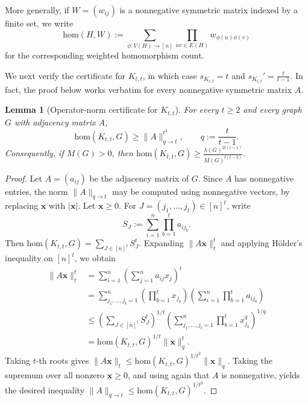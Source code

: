 \documentclass[11pt]{article}
\newtheorem{lemma}[theorem]{Lemma}
\theoremstyle{definition}
\theoremstyle{plain}
\newcommand{\homc}{\mathrm{hom}}
\begin{document}
More generally, if \(W=(w_{ij})\) is a nonnegative symmetric matrix indexed by a finite set, we write
\[
        \homc(H,W)
        :=
        \sum_{\phi:V(H)\to [n]}
        \prod_{uv\in E(H)} w_{\phi(u)\phi(v)}
\]
for the corresponding weighted homomorphism count.

We next verify the certificate for \(K_{t,t}\), in which case 
        $s_{K_{t,t}}=t$ and $
        s_{K_{t,t}}'=\frac{t}{t-1}.$
In fact, the proof below works verbatim for every nonnegative
symmetric matrix \(A\).

\begin{lemma}[Operator-norm certificate for \(K_{t,t}\)]
\label{lem:operator-certificate-Ktt}
For every \(t\ge2\) and every graph \(G\) with adjacency matrix \(A\),
\[
        \homc(K_{t,t},G)\ge \|A\|_{q\to t}^{t^2},
        \qquad
        q:=\frac{t}{t-1}.
\]
Consequently, if \(M(G)>0\), then
$\homc(K_{t,t},G)
        \ge
        \frac{\lambda(G)^{2t(t-1)}}{M(G)^{t(t-2)}}.
$
\end{lemma}

\begin{proof}
Let \(A=(a_{ij})\) be the adjacency matrix of \(G\).  Since \(A\) has
nonnegative entries, the norm \(\|A\|_{q\to t}\) may be computed using
nonnegative vectors, by replacing \(\bm{x}\) with \(|\bm{x}|\).
Let \(\bm{x}\ge0\).  For
\(J=(j_1,\ldots,j_t)\in[n]^t\), write
\[
        S_J
        :=
        \sum_{i=1}^n\prod_{b=1}^t a_{ij_b}.
\]
Then
$        \homc(K_{t,t},G)
        =
        \sum_{J\in[n]^t}S_J^t.$
Expanding \(\|A\bm{x}\|_t^t\) and applying H\"older's inequality on
\([n]^t\), we obtain
\[
\begin{aligned}
        \|A\bm{x}\|_t^t
        &=
        \sum_{i=1}^n
        \left(\sum_{j=1}^n a_{ij}x_j\right)^t                         \\
        &=
        \sum_{j_1,\ldots,j_t=1}^n
        \left(\prod_{b=1}^t x_{j_b}\right)
        \left(\sum_{i=1}^n\prod_{b=1}^t a_{ij_b}\right)                \\
        &\le
        \left(\sum_{J\in[n]^t}S_J^t\right)^{1/t}
        \left(
        \sum_{j_1,\ldots,j_t=1}^n
        \prod_{b=1}^t x_{j_b}^q
        \right)^{1/q}                                                  \\
        &=
        \homc(K_{t,t},G)^{1/t}\|\bm{x}\|_q^t .
\end{aligned}
\]
Taking \(t\)-th roots gives
$ \|A\bm{x}\|_t
        \le
        \homc(K_{t,t},G)^{1/t^2}\|\bm{x}\|_q .
$
Taking the supremum over all nonzero \(\bm{x}\ge0\), and using again
that \(A\) is nonnegative, yields the desired inequality
$        \|A\|_{q\to t}
        \le
        \homc(K_{t,t},G)^{1/t^2}.
$
\end{proof}
\end{document}

